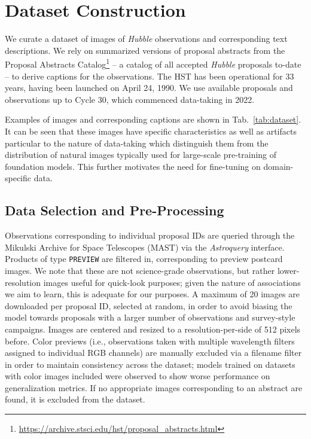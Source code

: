\documentclass[10pt]{article} %
\newcommand{\package}[1]{\textsl{#1}\xspace}
\newcommand{\hubble}{\emph{Hubble}\xspace}
\begin{document}
\section{Dataset Construction}
\label{sec:dataset}

We curate a dataset of images of \hubble observations and corresponding text descriptions. We rely on summarized versions of proposal abstracts from the Proposal Abstracts Catalog\footnote{\url{https://archive.stsci.edu/hst/proposal_abstracts.html}} -- a catalog of all accepted \hubble proposals to-date -- to derive captions for the observations. The HST has been operational for 33 years, having been launched on April 24, 1990. We use available proposals and observations up to Cycle 30, which commenced data-taking in 2022. 

Examples of images and corresponding captions are shown in Tab.~\ref{tab:dataset}. It can be seen that these images have specific characteristics as well as artifacts particular to the nature of data-taking which distinguish them from the distribution of natural images typically used for large-scale pre-training of foundation models. This further motivates the need for fine-tuning on domain-specific data.

\subsection{Data Selection and Pre-Processing}

Observations corresponding to individual proposal IDs are queried through the Mikulski Archive for Space Telescopes (MAST) via the \package{Astroquery} interface. Products of type \texttt{PREVIEW} are filtered in, corresponding to preview postcard images. We note that these are not science-grade observations, but rather lower-resolution images useful for quick-look purposes; given the nature of associations we aim to learn, this is adequate for our purposes. A maximum of 20 images are downloaded per proposal ID, selected at random, in order to avoid biasing the model towards proposals with a larger number of observations and survey-style campaigns. Images are centered and resized to a resolution-per-side of 512 pixels before. Color previews (i.e., observations taken with multiple wavelength filters assigned to individual RGB channels) are manually excluded via a filename filter in order to maintain consistency across the dataset; models trained on datasets with color images included were observed to show worse performance on generalization metrics. If no appropriate images corresponding to an abstract are found, it is excluded from the dataset.
\end{document}

